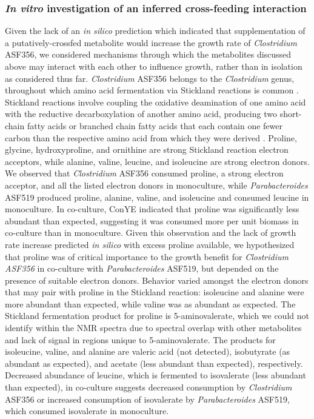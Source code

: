 \documentclass[11pt,twocolumn,notitlepage,openany,twoside]{book}
\begin{document}
\begin{refsection}
\subsubsection{\textit{In vitro} investigation of an inferred cross-feeding interaction}

Given the lack of an \textit{in silico} prediction which indicated that supplementation of a putatively-crossfed metabolite would increase the growth rate of \textit{Clostridium} ASF356, we considered mechanisms through which the metabolites discussed above may interact with each other to influence growth, rather than in isolation as considered thus far. \textit{Clostridium} ASF356 belongs to the \textit{Clostridium} genus, throughout which amino acid fermentation via Stickland reactions is common \cite{Mead1971-oa}. Stickland reactions involve coupling the oxidative deamination of one amino acid with the reductive decarboxylation of another amino acid, producing two short-chain fatty acids or branched chain fatty acids that each contain one fewer carbon than the respective amino acid from which they were derived \cite{Nisman1954-xl}. Proline, glycine, hydroxyproline, and ornithine are strong Stickland reaction electron acceptors, while alanine, valine, leucine, and isoleucine are strong electron donors. We observed that \textit{Clostridium} ASF356 consumed proline, a strong electron acceptor, and all the listed electron donors in monoculture, while \textit{Parabacteroides} ASF519 produced proline, alanine, valine, and isoleucine and consumed leucine in monoculture. In co-culture, ConYE indicated that proline was significantly less abundant than expected, suggesting it was consumed more per unit biomass in co-culture than in monoculture. Given this observation and the lack of growth rate increase predicted \textit{in silico} with excess proline available, we hypothesized that proline was of critical importance to the growth benefit for \textit{Clostridium ASF356} in co-culture with \textit{Parabacteroides} ASF519, but depended on the presence of suitable electron donors. Behavior varied amongst the electron donors that may pair with proline in the Stickland reaction: isoleucine and alanine were more abundant than expected, while valine was as abundant as expected. The Stickland fermentation product for proline is 5-aminovalerate, which we could not identify within the NMR spectra due to spectral overlap with other metabolites and lack of signal in regions unique to 5-aminovalerate. The products for isoleucine, valine, and alanine are valeric acid (not detected), isobutyrate (as abundant as expected), and acetate (less abundant than expected), respectively. Decreased abundance of leucine, which is fermented to isovalerate (less abundant than expected), in co-culture suggests decreased consumption by \textit{Clostridium} ASF356 or increased consumption of isovalerate by \textit{Parabacteroides} ASF519, which consumed isovalerate in monoculture.


\end{refsection}
\end{document}
